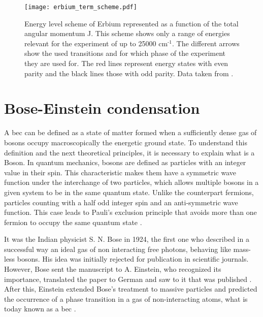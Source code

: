 \pagebreak


\begin{figure}[!htbp]\centering
	\texttt{[image: erbium\_term\_scheme.pdf]}
	\caption[Erbium energy scheme]{Energy level scheme of Erbium represented as a function of the total angular momentum J. This scheme shows only a range of energies relevant for the experiment of up to 25000 $\text{cm}^{\text{-1}}$. The different arrows show the used transitions and for which phase of the experiment they are used for. The red lines represent energy states with even parity and the black lines those with odd parity. Data taken from \cite{NIST}. }\label{fig:erbium_scheme}
\end{figure}


\section{Bose-Einstein condensation} \label{sec:bose-einstein_condensation}

A \acf{bec} can be defined as a state of matter formed when a sufficiently dense gas of bosons occupy macroscopically the energetic ground state. To understand this definition and the next theoretical principles, it is necessary to explain what is a Boson. In quantum mechanics, bosons are defined as particles with an integer value in their spin. This characteristic makes them have a symmetric wave function under the interchange of two particles, which allows multiple bosons in a given system to be in the same quantum state. Unlike the counterpart fermions, particles counting with a half odd integer spin and an anti-symmetric wave function. This case leads to Pauli's exclusion principle that avoids more than one fermion to occupy the same quantum state \cite{Pauli1925}.

It was the Indian physicist S. N. Bose in 1924, the first one who described in a successful way an ideal gas of non interacting free photons, behaving like mass-less bosons. His idea was initially rejected for publication in scientific journals. However, Bose sent the manuscript to A. Einstein, who recognized its importance, translated the paper to German and saw to it that was published \cite{Bose1924}. After this, Einstein extended Bose's treatment to massive particles and predicted the occurrence of a phase transition in a gas of non-interacting atoms, what is today known as a \ac{bec} \cite{Einstein1924, Einstein1925}.


